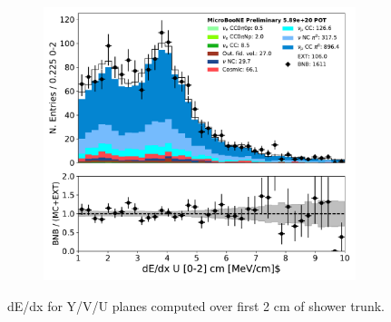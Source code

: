 \begin{figure}[H]
\begin{center}
\begin{subfigure}[b]{0.3\textwidth}
    \caption{}
    \end{subfigure}
    \begin{subfigure}[b]{0.3\textwidth}
    \centering
    \includegraphics[width=1.00\textwidth]{pi0/calorimetry/shr_tkfit_2cm_dedx_U_03112020_ALL_scaled.pdf}
    \caption{}
    \end{subfigure}
\caption{dE/dx for Y/V/U planes computed over first 2 cm of shower trunk.}
\label{fig:pi0:calorimetry:dedx2cm}
\end{center}
\end{figure}

